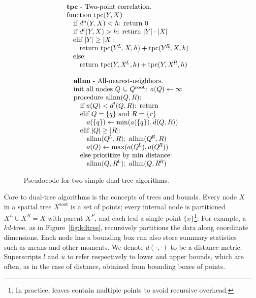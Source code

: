 \documentclass[times, leqno,twocolumn]{article}
\newcommand{\union}{\cup}
\newcommand{\fig}[1]{Figure~\ref{fig:#1}}
\newcommand{\psty}{}
\newcommand{\X}{\\ \psty}
\newcommand{\x}{\X \hspace{0.13in}}
\newcommand{\xx}{\X \hspace{0.26in}}
\newcommand{\kdroot}[1]{#1^{\text{root}}}
\newcommand{\kdleft}[1]{#1^{\!L}}
\newcommand{\kdright}[1]{#1^{\!R}}
\newcommand{\kdparent}[1]{#1^{\!P}}
\newcommand{\lo}[1]{#1^{l}}
\newcommand{\up}[1]{#1^{u}}
\newcommand{\distlo}{\lo{d}}
\newcommand{\distup}{\up{d}}
\newcommand{\dist}[2]{d(#1,#2)}
\begin{document}
\begin{figure*}
  \begin{minipage}{6in}
    \begin{minipage}{2.5in}
      \begin{displaymath}
        \begin{array}[t]{l}
          \text{{\bf tpc} - Two-point correlation.}
          \X \text{function tpc}(Y, X)
          \x \text{if }\distup(Y, X) < h\text{: return }0
          \x \text{if }\distlo(Y, X) > h\text{: return } |Y| \cdot |X|
          \x \text{elif }|Y| \geq |X|\text{:}
          \xx \text{return tpc}(\kdleft{Y}, X, h) + \text{tpc}(\kdright{Y}, X, h)
          \x \text{else:}
          \xx \text{return tpc}(Y, \kdleft{X}, h) + \text{tpc}(Y, \kdright{X}, h)
        \end{array}
       \end{displaymath}
       \caption{\footnotesize \label{fig:allnntpc} Pseudocode for two simple dual-tree algorithms.}
      \end{minipage}
      \begin{minipage}{3.0in}
       \begin{displaymath}
        \begin{array}[t]{l}
          \text{{\bf allnn} - All-nearest-neighbors.}
          \X \text{init all nodes }Q \subseteq \kdroot{Q}\text{: }a(Q) \gets \infty
          \X \text{procedure allnn}(Q,R)\text{:}
          \x \text{if }a(Q) < \distlo(Q, R)\text{: return}
          \x \text{elif }Q = \{q\} \text{ and } R = \{r\}
          \xx a(\{q\}) \gets \min(a(\{q\}), \dist{Q}{R})
          \x \text{elif }|Q| \geq |R|\text{:}
          \xx \text{allnn}(\kdleft{Q}, R); \text{ allnn}(\kdright{Q}, R)
          \xx a(Q) \gets \max(a(\kdleft{Q}), a(\kdright{Q}))
          \x \text{else prioritize by min distance:}
          \xx \text{allnn}(Q, \kdleft{R}); \text{ allnn}(Q, \kdright{R})
        \end{array}
       \end{displaymath}
      \end{minipage}
  \end{minipage}
\end{figure*}

Core to dual-tree algorithms is the concepts of trees and bounds.
Every node $X$ in a spatial tree $\kdroot{X}$ is a set of points; every internal node is partitioned $\kdleft{X} \union \kdright{X} = X$ with parent $\kdparent{X}$, and each leaf a single point $\{x\}$\footnote{In practice, leaves contain multiple points to avoid recursive overhead.}.
For example, a $kd$-tree\cite{kdtree}, as in \fig{kdtree}, recursively partitions the data along coordinate dimensions.
Each node has a bounding box can also store summary statistics such as means and other moments.
We denote $\dist{\cdot}{\cdot}$ to be a distance metric.
Superscripts $l$ and $u$ to refer respectively to lower and upper bounds, which are often, as in the case of distance, obtained from bounding boxes of points.
\end{document}
